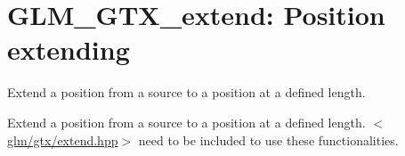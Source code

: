 \hypertarget{group__gtx__extend}{\section{\-G\-L\-M\-\_\-\-G\-T\-X\-\_\-extend\-: \-Position extending}
\label{group__gtx__extend}
}


\-Extend a position from a source to a position at a defined length.  


\-Extend a position from a source to a position at a defined length. $<$\hyperlink{extend_8hpp}{glm/gtx/extend.\-hpp}$>$ need to be included to use these functionalities. 